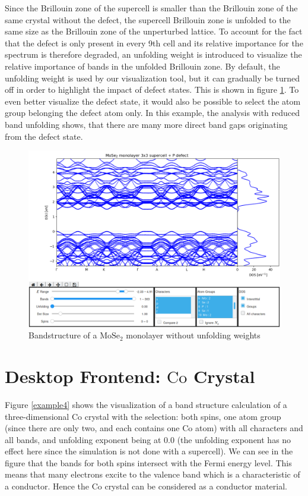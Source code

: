 Since the Brillouin zone of the supercell is smaller than the Brillouin zone of the same crystal without the defect, the supercell Brillouin zone is unfolded to the same size as the Brillouin zone of the unperturbed lattice. To account for the fact that the defect is only present in every 9th cell and its relative importance for the spectrum is therefore degraded, an unfolding weight is introduced to visualize the relative importance of bands in the unfolded Brillouin zone. By default, the unfolding weight is used by our visualization tool, but it can gradually be turned off in order to highlight the impact of defect states. This is shown in figure \ref{example3}. To even better visualize the defect state, it would also be possible to select the atom group belonging the defect atom only. In this example, the analysis with reduced band unfolding shows, that there are many more direct band gaps originating from the defect state.


\begin{figure}[htb!]
    \centering
    \includegraphics[width=1.0\linewidth]{img/gui_web_mose2_monolayer_unfold-0.png}
    \caption{Bandstructure of a $\textrm{MoSe}_2$ monolayer without unfolding weights}
    \label{example3}
\end{figure}


\section{Desktop Frontend: $\textrm{Co}$ Crystal}

Figure \ref{example4} shows the visualization of a band structure calculation of
a three-dimensional $\textrm{Co}$ crystal with the selection: both spins, one
atom group (since there are only two, and each contains one $\textrm{Co}$ atom)
with all characters and all bands, and unfolding exponent being at $0.0$ (the
unfolding exponent has no effect here since the simulation is not done with a
supercell). We can see in the figure that the bands for both spins intersect
with the Fermi energy level. This means that many electrons excite to the
valence band which is a characteristic of a conductor. Hence the $\textrm{Co}$
crystal can be considered as a conductor material.


